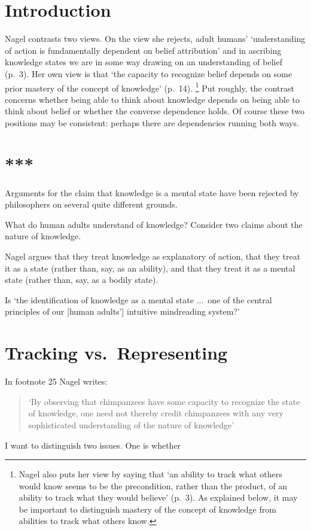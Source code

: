 \documentclass[11pt,a4paper]{extarticle}
\begin{document}
\section{Introduction}
Nagel contrasts two views.
On the view she rejects, adult humans' `understanding of action is fundamentally dependent on belief attribution' and in ascribing knowledge states we are in some way drawing on an understanding of belief (p.\ 3).
Her own view is that `the capacity to recognize belief depends on some prior mastery of the concept of knowledge' (p.\ 14).%
\footnote{
Nagel also puts her view by saying that `an ability to track what others would know seems to be the precondition, rather than the product, of an ability to track what they would believe' (p.\ 3).
As explained below, it may be important to distinguish mastery of the concept of knowledge from abilities to track what others know.
}
Put roughly, the contrast concerns whether being able to think about knowledge depends on being able to think about belief or whether the converse dependence holds.
Of course these two positions may be consistent: perhaps there are dependencies running both ways.  





\section{***}
Arguments for the claim that knowledge is a mental state have been rejected by philosophers on several quite different grounds.

What do human adults understand of knowledge?
Consider two claims about the nature of knowledge.



Nagel argues that they treat knowledge as explanatory of action, that they treat it as a state (rather than, say, as an ability), and that they treat it as a mental state (rather than, say, as a bodily state).
 

Is `the identification of knowledge as a mental state ...\ one of the central principles of our [human adults'] intuitive mindreading system?'




\section{Tracking vs.\ Representing}




In footnote 25 Nagel writes:
%
\begin{quote}
`By observing that chimpanzees have some capacity to recognize the state of knowledge, one need not thereby credit chimpanzees with any very sophisticated understanding of the nature of knowledge'
\end{quote}
%
I want to distinguish two issues.
One is whether 





\end{document}
